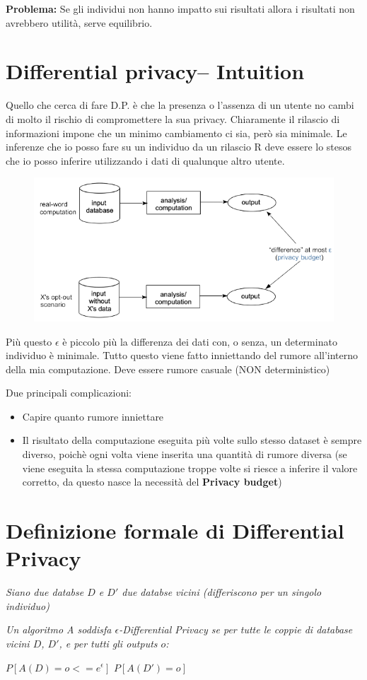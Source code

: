 \documentclass{report}
\begin{document}
\noindent \textbf{Problema:} Se gli individui non hanno impatto sui risultati allora i risultati non avrebbero utilità, serve equilibrio.

\section{Differential privacy– Intuition}
Quello che cerca di fare D.P. è che la presenza o l'assenza di un utente no cambi di molto il rischio di compromettere la sua privacy.
Chiaramente il rilascio di informazioni impone che un minimo cambiamento ci sia, però sia minimale.
Le inferenze che io posso fare su un individuo da un rilascio R deve essere lo stesos che io posso inferire utilizzando i dati di qualunque altro utente.
\begin{figure}[H]
        \centering
        \includegraphics[width=0.6\linewidth]{images/intuition.png}
    \end{figure}

\noindent Più questo $\epsilon$ è piccolo più la differenza dei dati con, o senza, un determinato individuo è minimale.
Tutto questo viene fatto inniettando del rumore all'interno della mia computazione. Deve essere rumore casuale (NON deterministico)

\noindent Due principali complicazioni:
\begin{itemize}
    \item Capire quanto rumore inniettare
    \item Il risultato della computazione eseguita più volte sullo stesso dataset è sempre diverso, poichè ogni volta viene inserita una quantità di rumore diversa (se viene eseguita la stessa computazione troppe volte si riesce a inferire il valore corretto, da questo nasce
    la necessità del \textbf{Privacy budget})
\end{itemize}

\section{Definizione formale di Differential Privacy}
\textit{Siano due databse $D$ e $D'$ due databse vicini (differiscono per un singolo individuo)}
\begin{center}
   \textit{Un algoritmo A soddisfa $\epsilon$-Differential Privacy se per tutte le coppie di database vicini
   $D$, $D'$, e per tutti  gli outputs $o$:}
   
   $P[A(D)= o <= e^\epsilon ]$ $P[A(D')= o]$ 
\end{center}
\end{document}
